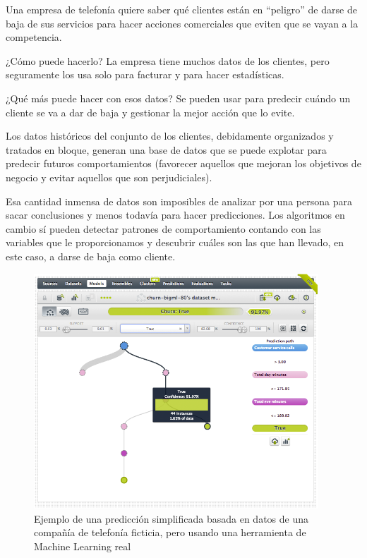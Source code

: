 \documentclass[a4paper, 11pt]{article} %
\begin{document}
\begin{shaded}
Una empresa de telefonía quiere saber qué clientes están en “peligro” de darse de baja de sus servicios para hacer acciones comerciales que eviten que se vayan a la competencia.

¿Cómo puede hacerlo? La empresa tiene muchos datos de los clientes, pero seguramente los usa solo para facturar y para hacer estadísticas.

¿Qué más puede hacer con esos datos? Se pueden usar para predecir cuándo un cliente se va a dar de baja y gestionar la mejor acción que lo evite.

Los datos históricos del conjunto de los clientes, debidamente organizados y tratados en bloque, generan una base de datos que se puede explotar para predecir futuros comportamientos (favorecer aquellos que mejoran los objetivos de negocio y evitar aquellos que son perjudiciales).

Esa cantidad inmensa de datos son imposibles de analizar por una persona para sacar conclusiones y menos todavía para hacer predicciones. Los algoritmos en cambio sí pueden detectar patrones de comportamiento contando con las variables que le proporcionamos y descubrir cuáles son las que han llevado, en este caso, a darse de baja como cliente.
\end{shaded}

\begin{figure}[H]
\centering
\includegraphics[width=0.95\textwidth]{ejemploMachineLearning.png}
\caption{Ejemplo de una predicción simplificada basada en datos de una compañía de telefonía ficticia, pero usando una herramienta de Machine Learning real}
\label{Ejemplo de una predicción simplificada basada en datos de una compañía de telefonía ficticia, pero usando una herramienta de Machine Learning real}
\end{figure}
\end{document}
